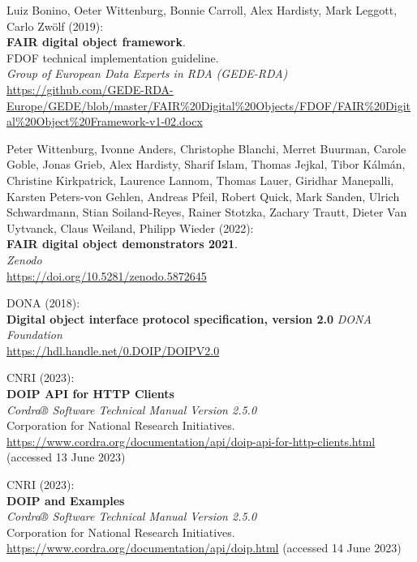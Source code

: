 \begin{thebibliography}{9}
Luiz Bonino, Oeter Wittenburg, Bonnie Carroll, Alex Hardisty, Mark
Leggott, Carlo Zwölf (2019): \\
\textbf{{FAIR} digital object framework}. \\
FDOF technical implementation guideline.\\
\emph{Group of European Data Experts in RDA (GEDE-RDA)}\\
\url{https://github.com/GEDE-RDA-Europe/GEDE/blob/master/FAIR\%20Digital\%20Objects/FDOF/FAIR\%20Digital\%20Object\%20Framework-v1-02.docx}

Peter Wittenburg, Ivonne Anders, Christophe Blanchi, Merret Buurman,
Carole Goble, Jonas Grieb, Alex Hardisty, Sharif Islam, Thomas Jejkal,
Tibor Kálmán, Christine Kirkpatrick, Laurence Lannom, Thomas Lauer,
Giridhar Manepalli, Karsten Peters-von Gehlen, Andreas Pfeil, Robert
Quick, Mark Sanden, Ulrich Schwardmann, Stian Soiland-Reyes, Rainer
Stotzka, Zachary Trautt, Dieter Van Uytvanck, Claus Weiland, Philipp
Wieder (2022): \\
\textbf{FAIR digital object demonstrators 2021}.\\
\emph{Zenodo}\\
\url{https://doi.org/10.5281/zenodo.5872645}

DONA (2018): \\
\textbf{Digital object interface protocol specification, version 2.0} 
\emph{DONA Foundation}\\
\url{https://hdl.handle.net/0.DOIP/DOIPV2.0}

CNRI (2023): \\
\textbf{DOIP API for HTTP Clients} \\
\emph{Cordra® Software Technical Manual Version 2.5.0}\\
Corporation for National Research Initiatives.
\url{https://www.cordra.org/documentation/api/doip-api-for-http-clients.html}
(accessed 13 June 2023)

CNRI (2023): \\
\textbf{DOIP and Examples} \\
\emph{Cordra® Software Technical Manual Version 2.5.0}\\
Corporation for National Research Initiatives.
\url{https://www.cordra.org/documentation/api/doip.html}
(accessed 14 June 2023)


\end{thebibliography}
